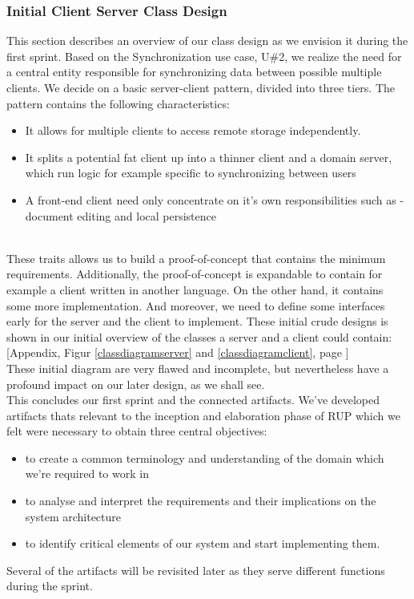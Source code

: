 \subsubsection{Initial Client Server Class Design}
This section describes an overview of our class design as we envision it during the first sprint. Based on the Synchronization use case, U\#2, we realize the need for a central entity responsible for synchronizing data between possible multiple clients. We decide on a basic server-client pattern, divided into three tiers. The pattern contains the following characteristics:\\
\begin{itemize}
\item It allows for multiple clients to access remote storage independently.
\item It splits a potential fat client up into a thinner client and a domain server, which run logic for example specific to synchronizing between users
\item A front-end client need only concentrate on it’s own responsibilities such as - document editing and local persistence
\end{itemize}
\cite{ttda}\\
These traits allows us to build a proof-of-concept that contains the minimum requirements. Additionally, the proof-of-concept is expandable to contain for example a client written in another language. On the other hand, it contains some more implementation. And moreover, we need to define some interfaces early for the server and the client to implement. These initial crude designs is shown in our initial overview of the classes a server and a client could contain: [Appendix, Figur \ref{classdiagramserver} and \ref{classdiagramclient}, page \pageref{classdiagramserver}]\\
These initial diagram are very flawed and incomplete, but nevertheless have a profound impact on our later design, as we shall see.\\
\newline
This concludes our first sprint and the connected artifacts. We’ve developed artifacts thats relevant to the inception and elaboration phase of RUP which we felt were necessary to obtain three central objectives:\\
\begin{itemize}
\item to create a common terminology and understanding of the domain which we’re required to work in
\item to analyse and interpret the requirements and their implications on the system architecture
\item to identify critical elements of our system and start implementing them.
\end{itemize}
Several of the artifacts will be revisited later as they serve different functions during the sprint.\\